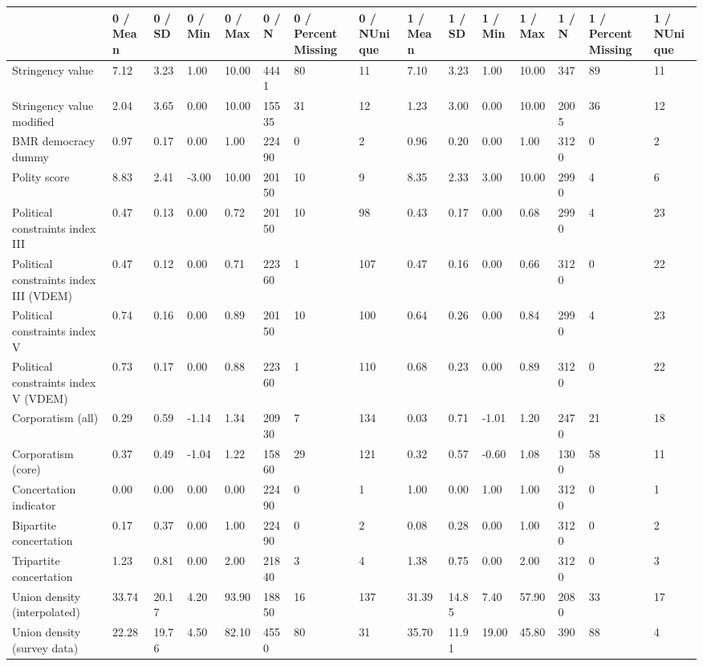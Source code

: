 
\begin{longtable}{lllllllllllllll}
\toprule
  & 0 / Mean & 0 / SD & 0 / Min & 0 / Max & 0 / N & 0 / PercentMissing & 0 / NUnique & 1 / Mean & 1 / SD & 1 / Min & 1 / Max & 1 / N & 1 / PercentMissing & 1 / NUnique\\
\midrule
Stringency value & 7.12 & 3.23 & 1.00 & 10.00 & 4441 & 80 & 11 & 7.10 & 3.23 & 1.00 & 10.00 & 347 & 89 & 11\\
Stringency value modified & 2.04 & 3.65 & 0.00 & 10.00 & 15535 & 31 & 12 & 1.23 & 3.00 & 0.00 & 10.00 & 2005 & 36 & 12\\
BMR democracy dummy & 0.97 & 0.17 & 0.00 & 1.00 & 22490 & 0 & 2 & 0.96 & 0.20 & 0.00 & 1.00 & 3120 & 0 & 2\\
Polity score & 8.83 & 2.41 & -3.00 & 10.00 & 20150 & 10 & 9 & 8.35 & 2.33 & 3.00 & 10.00 & 2990 & 4 & 6\\
Political constraints index III & 0.47 & 0.13 & 0.00 & 0.72 & 20150 & 10 & 98 & 0.43 & 0.17 & 0.00 & 0.68 & 2990 & 4 & 23\\
\addlinespace
Political constraints index III (VDEM) & 0.47 & 0.12 & 0.00 & 0.71 & 22360 & 1 & 107 & 0.47 & 0.16 & 0.00 & 0.66 & 3120 & 0 & 22\\
Political constraints index V & 0.74 & 0.16 & 0.00 & 0.89 & 20150 & 10 & 100 & 0.64 & 0.26 & 0.00 & 0.84 & 2990 & 4 & 23\\
Political constraints index V (VDEM) & 0.73 & 0.17 & 0.00 & 0.88 & 22360 & 1 & 110 & 0.68 & 0.23 & 0.00 & 0.89 & 3120 & 0 & 22\\
Corporatism (all) & 0.29 & 0.59 & -1.14 & 1.34 & 20930 & 7 & 134 & 0.03 & 0.71 & -1.01 & 1.20 & 2470 & 21 & 18\\
Corporatism (core) & 0.37 & 0.49 & -1.04 & 1.22 & 15860 & 29 & 121 & 0.32 & 0.57 & -0.60 & 1.08 & 1300 & 58 & 11\\
\addlinespace
Concertation indicator & 0.00 & 0.00 & 0.00 & 0.00 & 22490 & 0 & 1 & 1.00 & 0.00 & 1.00 & 1.00 & 3120 & 0 & 1\\
Bipartite concertation & 0.17 & 0.37 & 0.00 & 1.00 & 22490 & 0 & 2 & 0.08 & 0.28 & 0.00 & 1.00 & 3120 & 0 & 2\\
Tripartite concertation & 1.23 & 0.81 & 0.00 & 2.00 & 21840 & 3 & 4 & 1.38 & 0.75 & 0.00 & 2.00 & 3120 & 0 & 3\\
Union density (interpolated) & 33.74 & 20.17 & 4.20 & 93.90 & 18850 & 16 & 137 & 31.39 & 14.85 & 7.40 & 57.90 & 2080 & 33 & 17\\
Union density (survey data) & 22.28 & 19.76 & 4.50 & 82.10 & 4550 & 80 & 31 & 35.70 & 11.91 & 19.00 & 45.80 & 390 & 88 & 4\\

\end{longtable}
